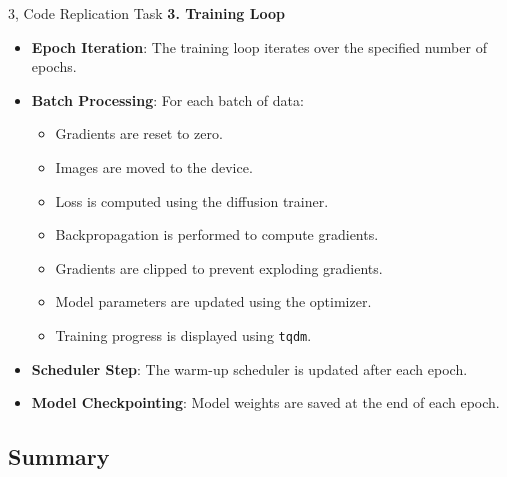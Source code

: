 \documentclass[10pt,a4paper]{article}
\begin{document}
\begin{task}{3, Code Replication Task}
\textbf{3. Training Loop}

\begin{itemize}
    \item \textbf{Epoch Iteration}: The training loop iterates over the specified number of epochs.
    \item \textbf{Batch Processing}: For each batch of data:
    \begin{itemize}
        \item Gradients are reset to zero.
        \item Images are moved to the device.
        \item Loss is computed using the diffusion trainer.
        \item Backpropagation is performed to compute gradients.
        \item Gradients are clipped to prevent exploding gradients.
        \item Model parameters are updated using the optimizer.
        \item Training progress is displayed using \texttt{tqdm}.
    \end{itemize}
    \item \textbf{Scheduler Step}: The warm-up scheduler is updated after each epoch.
    \item \textbf{Model Checkpointing}: Model weights are saved at the end of each epoch.
\end{itemize}
\subsection{Summary}


\end{task}
\end{document}
